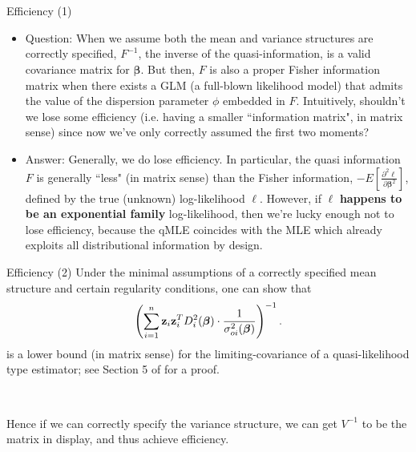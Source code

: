 \documentclass{beamer}
\newcommand{\boldbeta}{{\boldsymbol \beta}}
\newenvironment{wideitemize}%
  {\begin{itemize}%
    \setlength{\parskip}{1em}}%
  {\end{itemize}}
\begin{document}
\begin{frame} {Efficiency (1) }



\begin{wideitemize}
\item Question: When we assume both the mean and variance structures are correctly specified, $F^{-1}$, the inverse of the quasi-information,  is a valid covariance matrix for $\hat{\boldbeta}$. But then, $F$ is also a proper Fisher information matrix when there exists a GLM  (a full-blown likelihood model) that admits the value of the  dispersion parameter $\phi$ embedded in $F$. Intuitively, shouldn't we lose some efficiency (i.e. having a smaller ``information matrix", in matrix sense) since now we've only correctly assumed the first two moments?  





\item Answer: Generally, we do lose efficiency. In particular, the quasi information $F$ is generally ``less"  (in matrix sense) than the Fisher information, $- E[\frac{\partial^2 \ell }{\partial \boldbeta^2}]$,   defined by the true (unknown) log-likelihood $\ell$. However, if $\ell$ {\bf happens to be an exponential family} log-likelihood, then we're lucky enough not to lose efficiency, because the qMLE coincides with the MLE which already exploits all distributional information by design.



\end{wideitemize}
\end{frame}

\begin{frame} {Efficiency (2)}
Under the minimal assumptions of a correctly specified mean structure and certain regularity conditions, one can show that 
\[
\left(\sum_{i=1}^n\textbf{z}_i\textbf{z}_i^TD_i^2(\mbox{\boldmath $\beta$})\cdot\frac{1}{
\sigma_{oi}^2(\mbox{\boldmath $\beta$})} \right)^{-1}.
\]
is a lower bound (in matrix sense) for the limiting-covariance of a quasi-likelihood type estimator; see Section 5  of \cite{GMT1984}  for a proof. 

\ \

Hence if we can correctly specify the variance structure, we can get $V^{-1}$ to be the matrix in display, and thus achieve efficiency. 






\end{frame} 
\end{document}
